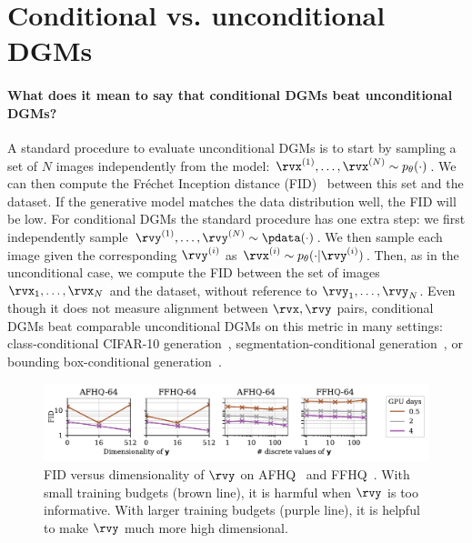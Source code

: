 
\section{Conditional vs. unconditional DGMs} \label{sec:2sdm-cond-vs-uncond-dgms}
\paragraph{What does it mean to say that conditional DGMs beat unconditional DGMs?} A standard procedure to evaluate unconditional DGMs is to start by sampling a set of $N$ images independently from the model: ${\rvx^{(1)},\ldots,\rvx^{(N)} \sim p_\theta(\cdot)}$. We can then compute the Fr\'echet Inception distance (FID)~\citep{heusel2017gans} between this set and the dataset. If the generative model matches the data distribution well, the FID will be low.
%
For conditional DGMs the standard procedure has one extra step: we first independently sample ${\rvy^{(1)},\ldots,\rvy^{(N)} \sim \pdata(\cdot)}$. We then sample each image given the corresponding $\rvy^{(i)}$ as ${\rvx^{(i)} \sim p_\theta(\cdot|\rvy^{(i)})}$. 
%
Then, as in the unconditional case, we compute the FID between the set of images $\rvx_1,\ldots,\rvx_N$ and the dataset, without reference to $\rvy_1,\ldots,\rvy_N$. Even though it does not measure alignment between $\rvx, \rvy$ pairs, conditional DGMs beat comparable unconditional DGMs on this metric in many settings: class-conditional CIFAR-10 generation~\citep{karras2022elucidating}, segmentation-conditional generation~\citep{hu2022self}, or bounding box-conditional generation~\citep{hu2022self}.

\begin{figure}[t]
    \centering
    \includegraphics[width=\textwidth]{figs/2sdm/cond-results-vs-nclusters.pdf}
    \caption{FID versus dimensionality of $\rvy$ on AFHQ~\citep{choi2020stargan} and FFHQ~\citep{karras2018style}. With small training budgets (brown line), it is harmful when $\rvy$ is too informative. With larger training budgets (purple line), it is helpful to make $\rvy$ much more high dimensional.}
    \label{fig:fid-vs-ncomp}
\end{figure}

